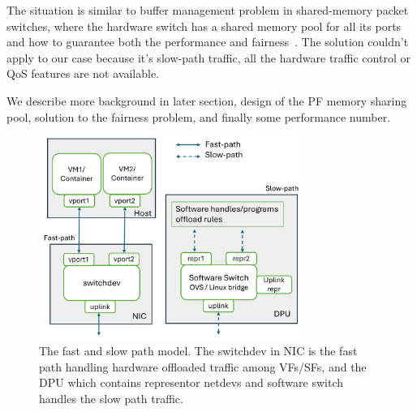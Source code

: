 \documentclass[letterpaper]{article}
\begin{document}
The situation is similar to buffer management problem in shared-memory
packet switches, where the hardware switch has a shared memory pool
for all its ports and how to guarantee both the performance and
fairness~\cite{devlinksb, queuelength}. The solution couldn't apply to
our case because it's slow-path traffic, all the hardware traffic
control or QoS features are not available.

We describe more background in later section, design of the PF memory
sharing pool, solution to the fairness problem, and finally some performance
number.
\begin{figure}[h]
\includegraphics[width=3.4in]{arch.pdf}
\caption{The fast and slow path model. The switchdev in NIC is the fast path handling
hardware offloaded traffic among VFs/SFs, and the DPU which contains representor netdevs and software switch handles the slow path traffic.}
\label{fig:arch}
\end{figure}

\end{document}
